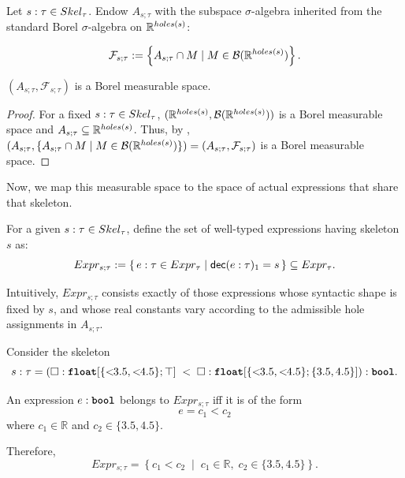 
\begin{definition}\label{def:sigma-algebra-construction-holes}
	Let $s : \tau \in Skel_{\tau}$. Endow $A_{s;\tau}$ with the subspace $\sigma$-algebra inherited from the standard Borel $\sigma$-algebra on $\mathbb{R}^{holes(s)}$:

	\[
		\mathcal{F}_{s;\tau} := \left\{A_{s;\tau} \cap M \mid M \in \mathcal{B}(\mathbb{R}^{holes(s)})\right\}.
	\]
\end{definition}

\begin{lemma}\label{lem:measurable-a-st}
	$(A_{s;\tau}, \mathcal{F}_{s;\tau})$ is a Borel measurable space.
\end{lemma}

\begin{proof}
	For a fixed $s : \tau \in Skel_{\tau}$, $(\mathbb{R}^{holes(s)}, \mathcal{B}(\mathbb{R}^{holes(s)}))$ is a Borel measurable space and $A_{s; \tau} \subseteq \mathbb{R}^{holes(s)}$. Thus, by , $(A_{s;\tau}, \{A_{s;\tau} \cap M \mid M \in \mathcal{B}(\mathbb{R}^{holes(s)})\}) = (A_{s;\tau}, \mathcal{F}_{s;\tau})$ is a Borel measurable space.
\end{proof}


Now, we map this measurable space to the space of actual expressions that share that skeleton. 

\begin{definition}
	For a given $s : \tau \in Skel_{\tau}$, define the set of well-typed expressions having skeleton $s$ as:
	\[
		Expr_{s;\tau}
		:= 
		\left\{\, e : \tau \in Expr_{\tau} \mid \mathsf{dec}(e : \tau)_1 = s \,\right\}
		\subseteq
		Expr_\tau.
	\]
\end{definition}

Intuitively, $Expr_{s;\tau}$ consists exactly of those expressions whose syntactic shape is fixed by $s$, and whose real constants vary according to the admissible hole assignments in $A_{s;\tau}$.

\begin{example}
	Consider the skeleton
	\[
		s : \tau 
		=
		(\square : \floattype{\{\clt{3.5}, \clt{4.5}\}}{\top}
		\;<\;
		\square : \floattype{\{\clt{3.5}, \clt{4.5}\}}{\{3.5,4.5\}})
		: \bool.
	\]
	
	An expression $e : \textnormal{\ttfamily\bfseries bool}$ belongs to $Expr_{s;\tau}$ iff it is of the form
	\[
		e = c_1 < c_2
	\]
	where $c_1 \in \mathbb{R}$ and $c_2 \in \{3.5,4.5\}$.
	
	Therefore,
	\[
		Expr_{s;\tau}
		=
		\left\{
			c_1 < c_2
			\;\middle|\;
			c_1 \in \mathbb{R},\; c_2 \in \{3.5,4.5\}
		\right\}.
	\]
\end{example}

